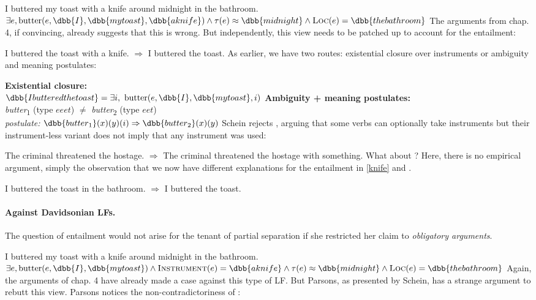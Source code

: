 \pex
\a 
I buttered my toast with a knife around midnight in the bathroom. 
\a
$\exists e, \text{butter}(e, \dbb{I}, \dbb{my toast}, \dbb{a knife})\wedge \tau(e)\approx \dbb{midnight} \wedge \textsc{Loc}(e) = \dbb{the bathroom}$
\xe
%
The arguments from chap. 4, if convincing, already suggests that this is wrong. But independently, this view needs to be patched up to account for the entailment:

\ex\label{knife}
I buttered the toast with a knife.
$\Rightarrow$
I buttered the toast.
\xe
%
As earlier, we have two routes: existential closure over instruments or ambiguity and meaning postulates:

\pex
\a \textbf{Existential closure:} \\
$\dbb{I buttered the toast} = 
\exists i,\ \text{butter}(e, \dbb{I}, \dbb{my toast}, i)$
\a \textbf{Ambiguity + meaning postulates:} \\
\emph{butter}\textsubscript{1} (type $eeet$) $\neq$ \emph{butter}\textsubscript{2} (type $eet$)\\
\emph{postulate:} $\dbb{butter\textsubscript{1}}(x)(y)(i) \Rightarrow \dbb{butter\textsubscript{2}}(x)(y)$
\xe
% 
Schein rejects \clastx[a], arguing that some verbs can optionally take instruments but their instrument-less variant does not imply that any instrument was used:

\ex
The criminal threatened the hostage.
$\Rightarrow$
The criminal threatened the hostage with something.
\xe
%
What about \clastx[b]? Here, there is no empirical argument, simply the observation that we now have different explanations for the entailment in \cref{knife} and \cnextx.

\ex
I buttered the toast in the bathroom.
$\Rightarrow$
I buttered the toast.
\xe
%

\paragraph{Against Davidsonian LFs.} The question of entailment would not arise for the tenant of partial separation if she restricted her claim to \emph{obligatory arguments}.

\pex
\a 
I buttered my toast with a knife around midnight in the bathroom. 
\a
$\exists e, \text{butter}(e, \dbb{I}, \dbb{my toast}) \wedge \textsc{Instrument}(e) =\dbb{a knife}\wedge \tau(e)\approx \dbb{midnight} \wedge \textsc{Loc}(e) = \dbb{the bathroom}$
\xe
%
Again, the arguments of chap. 4 have already made a case against this type of LF. But Parsons, as presented by Schein, has a strange argument to rebutt this view. Parsons notices the non-contradictoriness of \cnextx:

